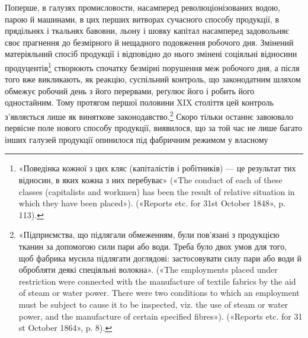 Поперше, в галузях промисловости, насамперед революціонізованих
водою, парою й машинами, в цих перших витворах сучасного
способу продукції, в прядільнях і ткальнях бавовни,
льону і шовку капітал насамперед задовольняє своє прагнення
до безмірного й нещадного подовження робочого дня. Змінений
матеріяльний спосіб продукції і відповідно до нього змінені
соціяльні відносини продуцентів\footnote{
«Поведінка кожної з цих кляс (капіталістів і робітників) — це
результат тих відносин, в яких кожна з них перебуває» («The conduct
of each of these classes (capitalists and workmen) has been the result of
relative situation in which they have been placed»). («Reports etc. for 31st
October 1848», p. 113).
} створюють спочатку безмірні
порушення меж робочого дня, а після того вже викликають,
як реакцію, суспільний контроль, що законодатним шляхом
обмежує робочий день з його перервами, реґулює його і робить
його одностайним. Тому протягом першої половини XIX століття
цей контроль з’являється лише як виняткове законодавство.\footnote{
«Підприємства, що підлягали обмеженням, були пов’язані з
продукцією тканин за допомогою сили пари або води. Треба було двох
умов для того, щоб фабрика мусила підлягати доглядові: застосовувати
силу пари або води й обробляти деякі спеціяльні волокна». («The employments
placed under restriction were connected with the manufacture of
textile fabrics by the aid of steam or water power. There were two conditions
to which an employment must be subject to cause it to be inspected,
viz. the use of steam or water power, and the manufacture of certain specified
fibres»). («Reports etc. for 31 st October 1864», p. 8).
}
Скоро тільки останнє завоювало первісне поле нового способу
продукції, виявилося, що за той час не лише багато інших галузей
продукції опинилося під фабричним режимом у власному
\parbreak{}  %
